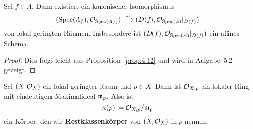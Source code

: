 \begin{lem}
\label{lem:4.16}
	Sei $f \in A$. Dann existiert ein kanonischer Isomorphismus
	\[
		(\operatorname{Spec}(A_f),\mathcal{O}_{\operatorname{Spec}(A_f)}) \overset{\sim}{\longrightarrow} (D(f),\mathcal{O}_{\operatorname{Spec}(A)}\vert_{D(f)})
	\]
	von lokal geringten Räumen. Insbesondere ist $(D(f),\mathcal{O}_{\operatorname{Spec}(A)}\vert_{D(f)})$ ein affines Schema.
	\begin{proof}
		Dies folgt leicht aus Proposition~\ref{prop:4.12} und wird in Aufgabe~5.2 gezeigt.
	\end{proof}
\end{lem}

\begin{defn}
	Sei $(X,\mathcal{O}_X)$ ein lokal geringter Raum und $p \in X$. Dann ist $\mathcal{O}_{X,p}$ ein lokaler Ring mit eindeutigem Maximalideal $\mathfrak{m}_p$. Also ist
	\[
		\kappa(p) \coloneqq \mathcal{O}_{X,p}/\mathfrak{m}_p
	\]
	ein Körper, den wir \textbf{Restklassenkörper} von $(X,\mathcal{O}_X)$ in $p$ nennen.
\end{defn}
